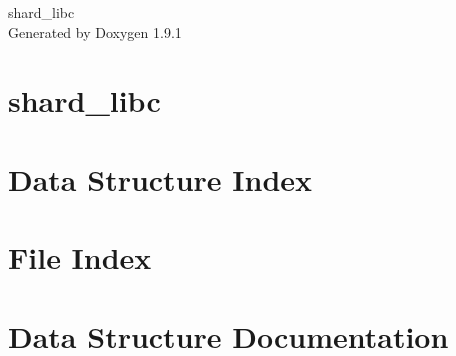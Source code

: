 \let\mypdfximage\pdfximage\def\pdfximage{\immediate\mypdfximage}\documentclass[twoside]{book}
\newcommand{\+}{\discretionary{\mbox{\scriptsize$\hookleftarrow$}}{}{}}
\newcommand{\clearemptydoublepage}{%
  \newpage{\pagestyle{empty}\cleardoublepage}%
}
\begin{document}
\raggedbottom

\hypersetup{pageanchor=false,
             bookmarksnumbered=true,
             pdfencoding=unicode
            }
\begin{titlepage}
\vspace*{7cm}
\begin{center}%
{\Large shard\+\_\+libc }\\
\vspace*{1cm}
{\large Generated by Doxygen 1.9.1}\\
\end{center}
\end{titlepage}
\clearemptydoublepage
{}
\tableofcontents
\clearemptydoublepage
{}
\hypersetup{pageanchor=true}

\chapter{shard\+\_\+libc}
\label{index}\hypertarget{index}{}
\chapter{Data Structure Index}

\chapter{File Index}

\chapter{Data Structure Documentation}


























\end{document}
